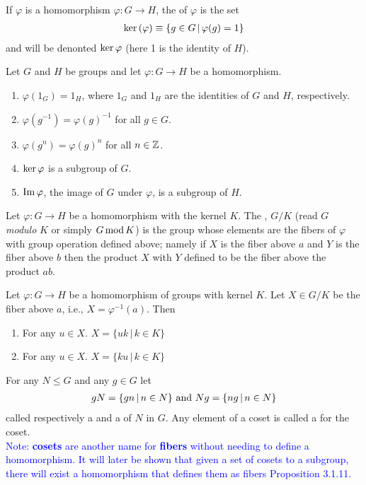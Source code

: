 \documentclass[10pt,a4paper]{report}
\newcommand{\BLUE}[1]{\textcolor{blue}{#1}}
\begin{document}
\begin{definition}[Kernel] If $\varphi$ is a homomorphism $\varphi: G \to H$, the  of $\varphi$ is the set
\begin{align*}
	\text{ker}\,(\varphi) \equiv \{g \in G\,|\,\varphi(g)=1\}
\end{align*}and will be denonted $\text{ker}\, \varphi$ (here 1 is the identity of $H$).
\end{definition}

\begin{prop}Let $G$ and $H$ be groups and let $\varphi: G \to H$ be a homomorphism.
\begin{enumerate}
	\item $\varphi(1_G)=1_H$, where $1_G$ and $1_H$ are the identities of $G$ and $H$, respectively.
	\item $\varphi(g^{-1})=\varphi(g)^{-1}$ for all $g \in G$.
	\item $\varphi(g^n)=\varphi(g)^n$ for all $n \in \mathbb{Z}$.
	\item $\text{ker}\, \varphi$ is a subgroup of $G$.
	\item $\operatorname{Im}\varphi$, the image of $G$ under $\varphi$, is a subgroup of $H$.
\end{enumerate}
\end{prop}

\begin{definition}Let $\varphi:G\to H$ be a homomorphism with the kernel $K$.  The , $G/K$ (read $G$  \textit{modulo} $K$ or simply $G\operatorname{mod} K$) is the group whose elements are the fibers of $\varphi$ with group operation defined above;  namely if $X$ is the fiber above $a$ and $Y$ is the fiber above $b$ then the product $X$ with $Y$ defined to be the fiber above the product $ab$.
\end{definition}

\begin{prop}Let $\varphi:G \to H$ be a homomorphism of groups with kernel $K$.  Let $X \in G/K$ be the fiber above $a$, i.e., $X=\varphi^{-1}(a)$.  Then
\begin{enumerate}
	\item For any $u \in X$.  $X=\{uk\,|\,k\in K\}$
	\item For any $u \in X$.  $X=\{ku\,|\,k \in K\}$
\end{enumerate}
\end{prop}

\begin{definition}[Coset]For any $N \le G$ and any $g \in G$ let
\begin{align*}
	gN=\{gn\,|\, n\in N\}\text{ and } Ng=\{ng\,|\,n \in N\}
\end{align*}called respectively a  and a  of $N$ in $G$.  Any element of a coset is called a  for the coset. \\
\BLUE{Note: \textbf{cosets} are another name for \textbf{fibers} without needing to define a homomorphism.  It will later be shown that given a set of cosets to a subgroup, there will exist a homomorphism that defines them as fibers Proposition 3.1.11.}
\end{definition}
\end{document}
